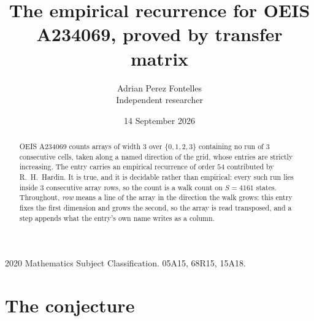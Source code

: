 \documentclass[11pt,a4paper]{article}
\title{The empirical recurrence for OEIS A234069, proved by transfer matrix}
\author{Adrian Perez Fontelles\\ \small Independent researcher}
\date{14 September 2026}
\theoremstyle{plain}
\theoremstyle{definition}
\begin{document}
\maketitle

\begin{abstract}
OEIS A234069 counts arrays of width $3$ over $\{0,1,2,3\}$ containing no run of $3$ consecutive
cells, taken along a named direction of the grid, whose entries are strictly increasing. The entry carries
an empirical recurrence of order $54$ contributed by R.~H.~Hardin. It is true, and it is
decidable rather than empirical: every such run lies inside $3$ consecutive array rows, so
the count is a walk count on $S=4161$ states.
 Throughout, \emph{row} means a line of the array in the direction the walk grows: this entry fixes the first dimension and grows the second, so the array is read transposed, and a step appends what the entry's own name writes as a column.\end{abstract}

\noindent\small 2020 Mathematics Subject Classification. 05A15, 68R15, 15A18.\normalsize

\section{The conjecture}
\end{document}
